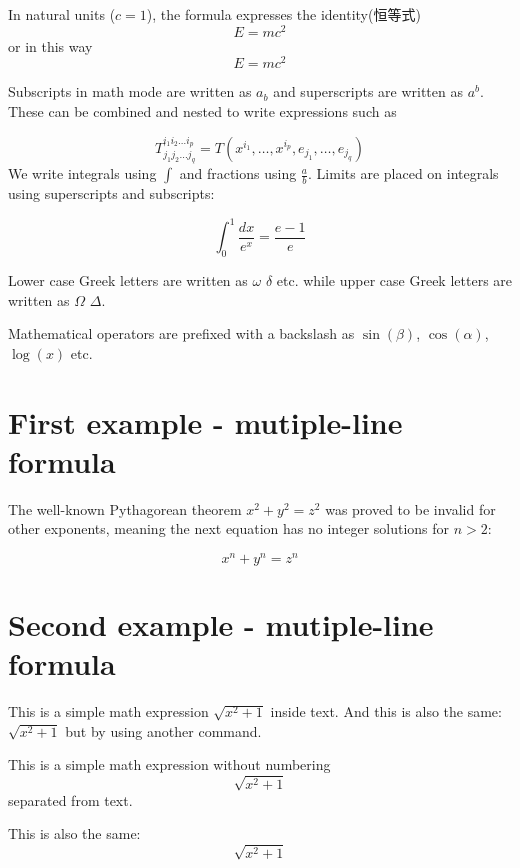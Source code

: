\documentclass[12pt, letterpaper]{article}
\begin{document}
In natural units ($c = 1$), the formula expresses the identity(恒等式)
\begin{equation}
E=mc^2
\end{equation}
or in this way
\begin{displaymath}
E=mc^2
\end{displaymath}

Subscripts in math mode are written as $a_b$ and superscripts are written as $a^b$. These can be combined and nested to write expressions such as

\[ T^{i_1 i_2 \dots i_p}_{j_1 j_2 \dots j_q} = T(x^{i_1},\dots,x^{i_p},e_{j_1},\dots,e_{j_q}) \]
We write integrals using $\int$ and fractions using $\frac{a}{b}$. Limits are placed on integrals using superscripts and subscripts:

\[ \int_0^1 \frac{dx}{e^x} =  \frac{e-1}{e} \]

Lower case Greek letters are written as $\omega$ $\delta$ etc. while upper case Greek letters are written as $\Omega$ $\Delta$.

Mathematical operators are prefixed with a backslash as $\sin(\beta)$, $\cos(\alpha)$, $\log(x)$ etc.

\section{First example - mutiple-line formula}

The well-known Pythagorean theorem \(x^2 + y^2 = z^2\) was proved to be invalid for other exponents, meaning the next equation has no integer solutions for \(n>2\):

\[ x^n + y^n = z^n \]

\section*{Second example - mutiple-line formula}

This is a simple math expression \(\sqrt{x^2+1}\) inside text. 
And this is also the same: 
\begin{math}
    \sqrt{x^2+1}
\end{math}
but by using another command.

This is a simple math expression without numbering
\[\sqrt{x^2+1}\] 
separated from text.

This is also the same:
\begin{displaymath}
    \sqrt{x^2+1}
\end{displaymath}
\end{document}
